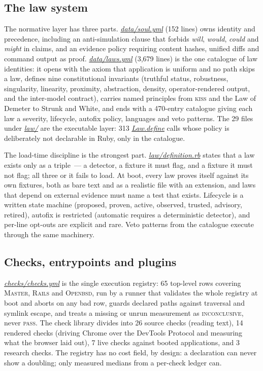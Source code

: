 \documentclass[oneside]{article}
\newcommand{\treename}[1]{\mbox{\textsc{#1}}}
\newcommand{\mtree}{\treename{Master}}
\newcommand{\rtree}{\treename{Rails}}
\newcommand{\otree}{\treename{Openbsd}}
\newcommand{\fpath}[1]{\emph{\url{#1}}}
\begin{document}
\subsection{The law system}

The normative layer has three parts. \fpath{data/soul.yml} (152 lines) owns identity and precedence, including an anti-simulation clause that forbids \emph{will}, \emph{would}, \emph{could} and \emph{might} in claims, and an evidence policy requiring content hashes, unified diffs and command output as proof. \fpath{data/laws.yml} (3,679 lines) is the one catalogue of law identities: it opens with the axiom that application is uniform and no path skips a law, defines nine constitutional invariants (truthful status, robustness, singularity, linearity, proximity, abstraction, density, operator-rendered output, and the inter-model contract), carries named principles from \textsc{kiss} and the Law of Demeter to Strunk and White, and ends with a 470-entry catalogue giving each law a severity, lifecycle, autofix policy, languages and veto patterns. The 29 files under \fpath{law/} are the executable layer: 313 \fpath{Law.define} calls whose policy is deliberately not declarable in Ruby, only in the catalogue.

The load-time discipline is the strongest part. \fpath{law/definition.rb} states that a law exists only as a triple~--- a detector, a fixture it must flag, and a fixture it must not flag; all three or it fails to load. At boot, every law proves itself against its own fixtures, both as bare text and as a realistic file with an extension, and laws that depend on external evidence must name a test that exists. Lifecycle is a written state machine (proposed, proven, active, observed, trusted, advisory, retired), autofix is restricted (automatic requires a deterministic detector), and per-line opt-outs are explicit and rare. Veto patterns from the catalogue execute through the same machinery.

\subsection{Checks, entrypoints and plugins}

\fpath{checks/checks.yml} is the single execution registry: 65 top-level rows covering \mtree, \rtree{} and \otree, run by a runner that validates the whole registry at boot and aborts on any bad row, guards declared paths against traversal and symlink escape, and treats a missing or unrun measurement as \textsc{inconclusive}, never \textsc{pass}. The check library divides into 26 source checks (reading text), 14 rendered checks (driving Chrome over the DevTools Protocol and measuring what the browser laid out), 7 live checks against booted applications, and 3 research checks. The registry has no cost field, by design: a declaration can never show a doubling; only measured medians from a per-check ledger can.
\end{document}
